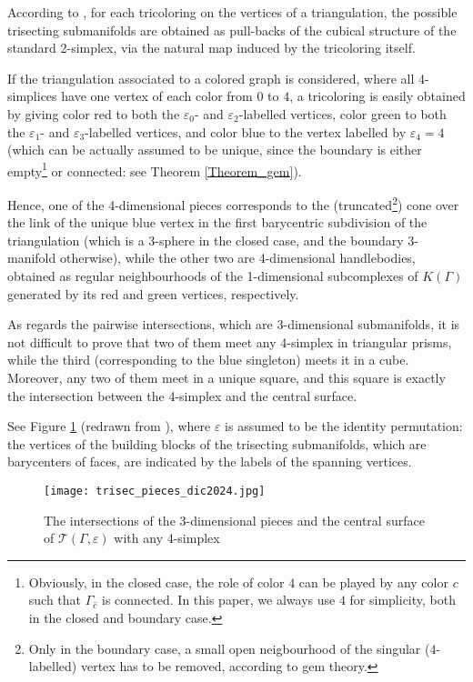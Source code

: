 \documentclass[12pt,a4paper]{article}
\newcommand{\e}{\varepsilon}
\begin{document}

\par \noindent 
According to \cite{Bell-et-al}, for each tricoloring on the vertices of a triangulation, the possible trisecting submanifolds are obtained as pull-backs of the cubical structure of the standard 2-simplex, via the natural map induced by the tricoloring itself. 

If the triangulation associated to a colored graph is considered, where all 4-simplices have one vertex of each color from $0$ to $4$, a tricoloring is easily obtained by giving color red to both the $\e_0$- and $\e_2$-labelled vertices, color green to both the $\e_1$- and $\e_3$-labelled vertices, and color blue to the vertex labelled by $\e_4=4$ (which can be actually assumed to be unique, since the boundary is either empty\footnote{Obviously, in the closed case, the role of color $4$ can be played by any color $c$ such that $\Gamma_{\hat c}$ is connected. In this paper, we always use $4$ for simplicity, both in the closed and boundary case.} or connected: see Theorem \ref{Theorem_gem}). 

Hence, one of the 4-dimensional pieces corresponds to the (truncated\footnote{Only in the boundary case, a small open neigbourhood of the singular ($4$-labelled) vertex has to be removed, according to gem theory.}) cone over the link of the unique blue vertex in the first barycentric subdivision of the triangulation (which is a 3-sphere in the closed case, and the boundary 3-manifold  otherwise), while the other two are 4-dimensional handlebodies, obtained as regular neighbourhoods of the 1-dimensional subcomplexes of $K(\Gamma)$ generated by its red and green vertices, respectively. 

As regards the pairwise intersections, which are 3-dimensional submanifolds, it is not difficult to prove that two of them meet any 4-simplex in triangular prisms, while the third (corresponding to the blue singleton) meets it in a cube. Moreover, any two of them meet in a unique square, and this square is exactly the intersection between the 4-simplex and the central surface.

See Figure \ref{fig:trisec_pieces} (redrawn from \cite{Spreer-Tillmann(Exp)}), where $\e$ is assumed to be the identity permutation: the vertices of the building blocks of the trisecting submanifolds, which are barycenters of faces, are indicated by the labels of the spanning vertices. 

 \begin{figure}   [h!]
     \centering
    \texttt{[image: trisec\_pieces\_dic2024.jpg]}
    \caption{The intersections of the 3-dimensional pieces and the central surface of $\mathcal  T(\Gamma, \varepsilon)$ with any 4-simplex}
     \label{fig:trisec_pieces}
 \end{figure}
\end{document}

